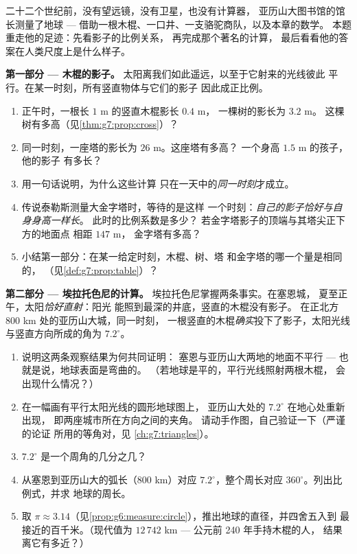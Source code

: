 \begin{problem}
\label{pb:g7:prop:1}
二十二个世纪前，没有望远镜，没有卫星，也没有计算器，
亚历山大图书馆的馆长测量了地球 ---
借助一根木棍、一口井、一支骆驼商队，以及本章的数学。
本题重走他的足迹：先看影子的比例关系，
再完成那个著名的计算，
最后看看他的答案在人类尺度上是什么样子。

\medskip
\noindent\textbf{第一部分 --- 木棍的影子。}
太阳离我们如此遥远，以至于它射来的光线彼此
平行。在某一时刻，所有竖直物体与它们的影子
因此成正比例。
\begin{enumerate}
  \item 正午时，一根长 $1$ m 的竖直木棍影长 $0.4$ m，
        一棵树的影长为 $3.2$ m。
        这棵树有多高（见\cref{thm:g7:prop:cross}）？
  \item 同一时刻，一座塔的影长为 $26$ m。这座塔有多高？
        一个身高 $1.5$ m 的孩子，他的影子
        有多长？
  \item 用一句话说明，为什么这些计算
        只在一天中的\emph{同一时刻}才成立。
  \item 传说泰勒斯测量大金字塔时，等待的是这样
        一个时刻：\emph{自己的影子恰好与自身身高一样长}。
        此时的比例系数是多少？
        若金字塔影子的顶端与其塔尖正下方的地面点
        相距 $147$ m，
        金字塔有多高？
  \item 小结第一部分：在某一给定时刻，木棍、树、塔
        和金字塔的哪一个量是相同的，
        （见\cref{def:g7:prop:table}）？
\end{enumerate}

\medskip
\noindent\textbf{第二部分 --- 埃拉托色尼的计算。}
埃拉托色尼掌握两条事实。在塞恩城，
夏至正午，太阳\emph{恰好直射}：阳光
能照到最深的井底，竖直的木棍没有影子。
在正北方 $800$ km 处的亚历山大城，同一时刻，
一根竖直的木棍\emph{确实}投下了影子，太阳光线
与竖直方向所成的角为 $7.2^\circ$。
\begin{enumerate}[resume]
  \item 说明这两条观察结果为何共同证明：
        塞恩与亚历山大两地的地面不平行
        --- 也就是说，地球表面是弯曲的。
        （若地球是平的，平行光线照射两根木棍，
        会出现什么情况？）
  \item 在一幅画有平行太阳光线的圆形地球图上，
        亚历山大处的 $7.2^\circ$ 在地心处重新出现，
        即两座城市所在方向之间的夹角。
        请动手作图，自己验证一下（严谨的论证
        所用的等角对，见
        \cref{ch:g7:triangles}）。
  \item $7.2^\circ$ 是一个周角的几分之几？
  \item 从塞恩到亚历山大的弧长（$800$ km）对应
        $7.2^\circ$，整个周长对应
        $360^\circ$。列出比例式，并求
        地球的周长。
  \item 取 $\pi \approx
        3.14$（见\cref{prop:g6:measure:circle}），推出地球的直径，并四舍五入到
        最接近的百千米。（现代值为
        $12\,742$ km --- 公元前 240 年手持木棍的人，
        结果离它有多近？）
\end{enumerate}


\end{problem}
